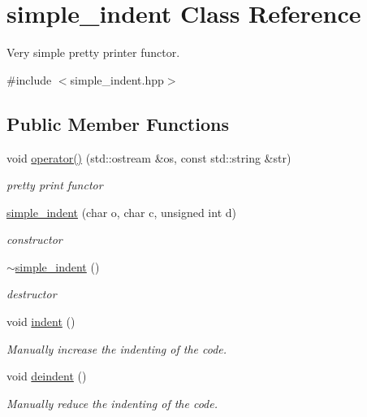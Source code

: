 \hypertarget{classsimple__indent}{}\section{simple\+\_\+indent Class Reference}
\label{classsimple__indent}


Very simple pretty printer functor.  




{\ttfamily \#include $<$simple\+\_\+indent.\+hpp$>$}

\subsection*{Public Member Functions}
\begin{DoxyCompactItemize}
\item 
void \hyperlink{classsimple__indent_a3199d4f7593b10ca63ab8955e43f3985}{operator()} (std\+::ostream \&os, const std\+::string \&str)
\begin{DoxyCompactList}\small\item\em pretty print functor \end{DoxyCompactList}\item 
\hyperlink{classsimple__indent_a35f01c5da24340ddb20e2963c9017f65}{simple\+\_\+indent} (char o, char c, unsigned int d)
\begin{DoxyCompactList}\small\item\em constructor \end{DoxyCompactList}\item 
\hyperlink{classsimple__indent_a4fdd904c16c34cba860c86939651b9a3}{$\sim$simple\+\_\+indent} ()
\begin{DoxyCompactList}\small\item\em destructor \end{DoxyCompactList}\item 
void \hyperlink{classsimple__indent_aa88aafba2edf16742b332625ef292a20}{indent} ()
\begin{DoxyCompactList}\small\item\em Manually increase the indenting of the code. \end{DoxyCompactList}\item 
void \hyperlink{classsimple__indent_ae22b30d747a97908e638a655364e498f}{deindent} ()
\begin{DoxyCompactList}\small\item\em Manually reduce the indenting of the code. \end{DoxyCompactList}\end{DoxyCompactItemize}
